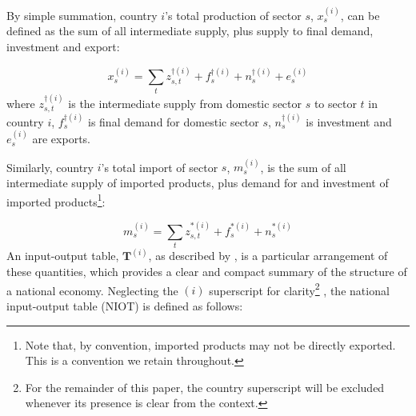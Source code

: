 \documentclass{article}
\begin{document}
By simple summation, country $i$'s total production of sector $s$, $x_s^{(i)}$, can be defined as the sum of all intermediate supply, plus supply to final demand, investment and export:

\begin{equation}\label{eqn:x}
x_s^{(i)}=\sum\limits_{t}z_{s,t}^{\dagger(i)} + f_s^{\dagger(i)} + n_s^{\dagger(i)} + e_s^{(i)}
\end{equation}
where $z_{s,t}^{\dagger(i)}$ is the intermediate supply from domestic sector $s$ to sector $t$ in country $i$, $f_s^{\dagger(i)}$ is final demand for domestic sector $s$, $n_s^{\dagger(i)}$ is investment and $e_s^{(i)}$ are exports.

Similarly, country $i$'s total import of sector $s$, $m_s^{(i)}$, is the sum of all intermediate supply of imported products, plus demand for and investment of imported products\footnote{
Note that, by convention, imported products may not be directly exported.
This is a convention we retain throughout.
}:

\begin{equation}\label{eqn:m}
m_s^{(i)}=\sum\limits_{t}z_{s,t}^{*(i)} + f_s^{*(i)} + n_s^{*(i)}
\end{equation}
An input-output table, $\boldsymbol{T}^{(i)}$, as described by \textcite{miller_input-output_1985}, is a particular arrangement of these quantities, which provides a clear and compact summary of the structure of a national economy.
Neglecting the $(i)$ superscript for clarity\footnote{
For the remainder of this paper, the country superscript will be excluded whenever its presence is clear from the context.}
, the national input-output table (NIOT) is defined as follows:
\end{document}
